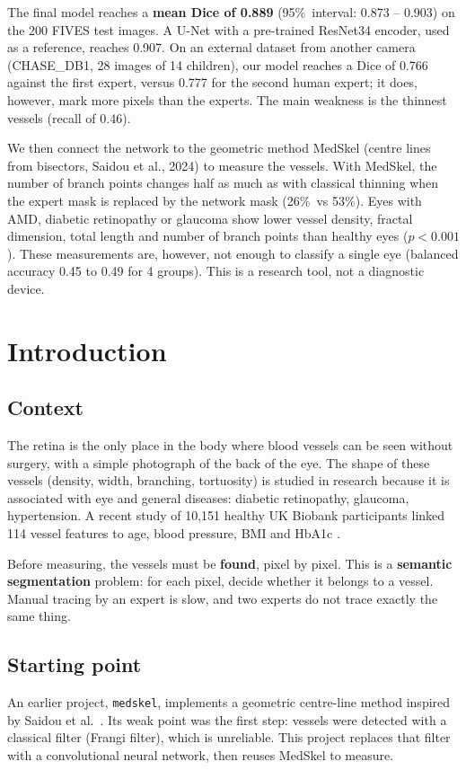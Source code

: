 \documentclass[11pt,a4paper]{article}
\newcommand{\pct}{\%}
\begin{document}
The final model reaches a \textbf{mean Dice of 0.889} (95\pct\ interval: 0.873 -- 0.903) on the 200 FIVES test images. A U-Net with a pre-trained ResNet34 encoder, used as a reference, reaches 0.907. On an external dataset from another camera (CHASE\_DB1, 28 images of 14 children), our model reaches a Dice of 0.766 against the first expert, versus 0.777 for the second human expert; it does, however, mark more pixels than the experts. The main weakness is the thinnest vessels (recall of 0.46).

We then connect the network to the geometric method MedSkel (centre lines from bisectors, Saidou et al., 2024) to measure the vessels. With MedSkel, the number of branch points changes half as much as with classical thinning when the expert mask is replaced by the network mask (26\pct\ vs 53\pct). Eyes with AMD, diabetic retinopathy or glaucoma show lower vessel density, fractal dimension, total length and number of branch points than healthy eyes ($p<0.001$). These measurements are, however, not enough to classify a single eye (balanced accuracy 0.45 to 0.49 for 4 groups). This is a research tool, not a diagnostic device.

\tableofcontents
\newpage

\section{Introduction}

\subsection{Context}
The retina is the only place in the body where blood vessels can be seen without surgery, with a simple photograph of the back of the eye. The shape of these vessels (density, width, branching, tortuosity) is studied in research because it is associated with eye and general diseases: diabetic retinopathy, glaucoma, hypertension. A recent study of 10{,}151 healthy UK Biobank participants linked 114 vessel features to age, blood pressure, BMI and HbA1c \cite{yusufu}.

Before measuring, the vessels must be \textbf{found}, pixel by pixel. This is a \textbf{semantic segmentation} problem: for each pixel, decide whether it belongs to a vessel. Manual tracing by an expert is slow, and two experts do not trace exactly the same thing.

\subsection{Starting point}
An earlier project, \texttt{medskel}, implements a geometric centre-line method inspired by Saidou et al.\ \cite{saidou}. Its weak point was the first step: vessels were detected with a classical filter (Frangi filter), which is unreliable. This project replaces that filter with a convolutional neural network, then reuses MedSkel to measure.
\end{document}
